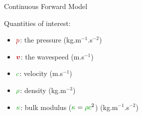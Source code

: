 \begin{frame}{Continuous Forward Model}
\vspace{-0.5cm}
\begin{block}{Quantities of interest:}

\begin{multicols}{2}

\begin{itemize}
\item $\contP$: the pressure (kg.m$^{-1}$.s$^{-2}$)
\item $\contV$: the wavespeed  (m.s$^{-1}$)
\end{itemize}

\columnbreak

\begin{itemize}
\item $\velocity$: velocity  (m.s$^{-1}$)
\item $\density$:  density  (kg.m$^{-3}$)
\item $\bm$:       bulk modulus ($\bm = \density  \velocity^2$) (kg.m$^{-1}$.s$^{-2}$)
\end{itemize}

\end{multicols}
\end{block}

\end{frame}

